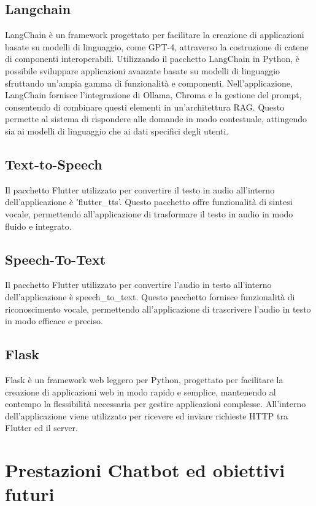 \subsection{Langchain}
LangChain è un framework progettato per facilitare la creazione di applicazioni basate su modelli di linguaggio, come GPT-4, attraverso la costruzione di catene di componenti interoperabili. Utilizzando il pacchetto LangChain in Python, è possibile sviluppare applicazioni avanzate basate su modelli di linguaggio sfruttando un'ampia gamma di funzionalità e componenti.
Nell'applicazione, LangChain fornisce l'integrazione di Ollama, Chroma e la gestione del prompt, consentendo di combinare questi elementi in un'architettura RAG. Questo permette al sistema di rispondere alle domande in modo contestuale, attingendo sia ai modelli di linguaggio che ai dati specifici degli utenti.

\subsection{Text-to-Speech}
Il pacchetto Flutter utilizzato per convertire il testo in audio all'interno dell'applicazione è 'flutter\_tts'. Questo pacchetto offre funzionalità di sintesi vocale, permettendo all'applicazione di trasformare il testo in audio in modo fluido e integrato.

\subsection{Speech-To-Text}
Il pacchetto Flutter utilizzato per convertire l'audio in testo all'interno dell'applicazione è speech\_to\_text. Questo pacchetto fornisce funzionalità di riconoscimento vocale, permettendo all'applicazione di trascrivere l'audio in testo in modo efficace e preciso.

\subsection{Flask}
Flask è un framework web leggero per Python, progettato per facilitare la creazione di applicazioni web in modo rapido e semplice, mantenendo al contempo la flessibilità necessaria per gestire applicazioni complesse.
All'interno dell'applicazione viene utilizzato per ricevere ed inviare richieste HTTP tra Flutter ed il server.

\section{Prestazioni Chatbot ed obiettivi futuri}


